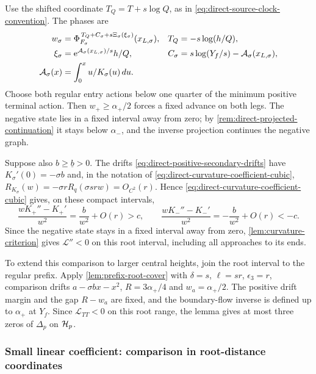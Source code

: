 Use the shifted coordinate \(T_Q=T+s\log Q\), as in \eqref{eq:direct-source-clock-convention}.
The phases are
\begin{equation}
\label{eq:direct-positive-secondary-phases}
 \begin{aligned}
 w_\sigma&=\Phi_{F_\sigma}^{\,T_Q+C_\sigma+
                                  s\Xi_\sigma(\xi_\sigma)}(x_{L,\sigma}),
 &T_Q&=-s\log(h/Q),\\
 \xi_\sigma&=\mathrm e^{\mathcal A_\sigma(x_{L,\sigma})/s}h/Q,
 &C_\sigma&=s\log(Y_f/s)-\mathcal A_\sigma(x_{L,\sigma}),\\
 \mathcal A_\sigma(x)&=\int_0^x u/K_\sigma(u)\,du .
 \end{aligned}
\end{equation}
Choose both regular entry actions below one quarter of the minimum
positive terminal action. Then \(w_+\ge\alpha_+/2\) forces a
fixed advance on both legs. The negative state lies in a fixed
interval away from zero; by \cref{rem:direct-projected-continuation}
it stays below \(\alpha_-\), and the inverse projection continues the
negative graph.

Suppose also \(b\ge \underline b>0\). The drifts
\eqref{eq:direct-positive-secondary-drifts} have
\(K_\sigma'(0)=-\sigma b\) and, in the notation of
\eqref{eq:direct-curvature-coefficient-cubic},
\(R_{K_\sigma}(w)=-\sigma rR_q(\sigma srw)=O_{C^2}(r)\). Hence
\eqref{eq:direct-curvature-coefficient-cubic} gives, on these compact
intervals,
\[
 \frac{wK_+''-K_+'}{w^2}=\frac b{w^2}+O(r)>c,\qquad
 \frac{wK_-''-K_-'}{w^2}=-\frac b{w^2}+O(r)<-c .
\]
Since the negative state stays in a fixed interval away from zero,
\cref{lem:curvature-criterion} gives \(\mathcal L''<0\) on this root
interval, including all approaches to its ends.

To extend this comparison to larger central heights, join the root
interval to the regular prefix.
Apply \cref{lem:prefix-root-cover} with \(\delta=s\), \(\ell=sr\),
\(\epsilon_3=r\), comparison drifts \(a-\sigma bx-x^2\),
\(R=3\alpha_+/4\) and \(w_a=\alpha_+/2\).
The positive drift margin and the gap \(R-w_a\) are fixed, and the
boundary-flow inverse is defined up to \(\alpha_+\) at \(Y_f\).
Since \(\mathcal L_{TT}<0\) on this root range, the lemma gives at most
three zeros of \(\Delta_p\) on \(\mathcal H_p\).

\subsubsection{Small linear coefficient: comparison in root-distance coordinates}

